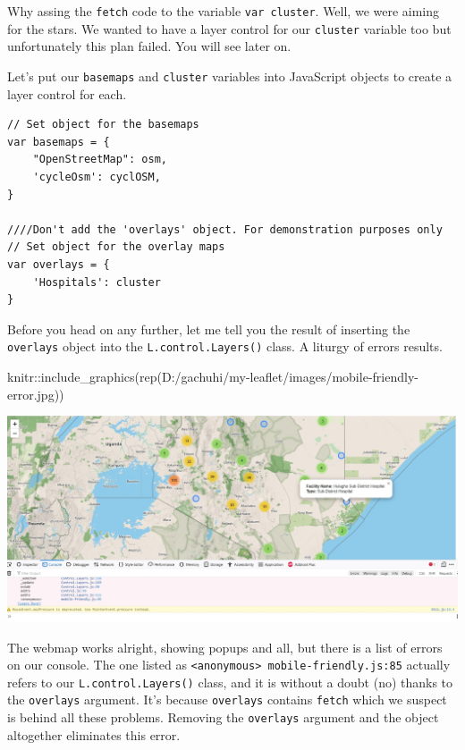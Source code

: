 \documentclass[
]{book}
\newenvironment{Shaded}{\begin{snugshade}}{\end{snugshade}}
\newcommand{\FunctionTok}[1]{\textcolor[rgb]{0.00,0.00,0.00}{#1}}
\newcommand{\NormalTok}[1]{#1}
\newcommand{\SpecialCharTok}[1]{\textcolor[rgb]{0.00,0.00,0.00}{#1}}
\newcommand{\StringTok}[1]{\textcolor[rgb]{0.31,0.60,0.02}{#1}}
\begin{document}
Why assing the \texttt{fetch} code to the variable \texttt{var\ cluster}. Well, we were aiming for the stars. We wanted to have a layer control for our \texttt{cluster} variable too but unfortunately this plan failed. You will see later on.

Let's put our \texttt{basemaps} and \texttt{cluster} variables into JavaScript objects to create a layer control for each.

\begin{verbatim}
// Set object for the basemaps
var basemaps = {
    "OpenStreetMap": osm,
    'cycleOsm': cyclOSM,
}

////Don't add the 'overlays' object. For demonstration purposes only
// Set object for the overlay maps
var overlays = {
    'Hospitals': cluster
}
\end{verbatim}

Before you head on any further, let me tell you the result of inserting the \texttt{overlays} object into the \texttt{L.control.Layers()} class. A liturgy of errors results.

\begin{Shaded}
\begin{Highlighting}[]
\NormalTok{knitr}\SpecialCharTok{::}\FunctionTok{include\_graphics}\NormalTok{(}\FunctionTok{rep}\NormalTok{(}\StringTok{\textquotesingle{}D:/gachuhi/my{-}leaflet/images/mobile{-}friendly{-}error.jpg\textquotesingle{}}\NormalTok{))}
\end{Highlighting}
\end{Shaded}

\includegraphics[width=26.19in]{../images/mobile-friendly-error}

The webmap works alright, showing popups and all, but there is a list of errors on our console. The one listed as \texttt{\textless{}anonymous\textgreater{}\ mobile-friendly.js:85} actually refers to our \texttt{L.control.Layers()} class, and it is without a doubt (no) thanks to the \texttt{overlays} argument. It's because \texttt{overlays} contains \texttt{fetch} which we suspect is behind all these problems. Removing the \texttt{overlays} argument and the object altogether eliminates this error.
\end{document}
